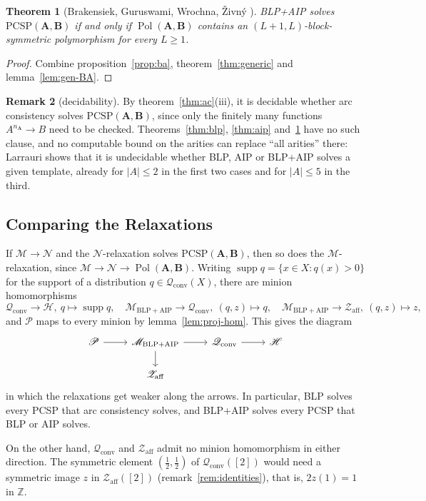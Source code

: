 \documentclass[11pt]{article}
\theoremstyle{plain}
\newtheorem{theorem}{Theorem}[section]
\theoremstyle{definition}
\newtheorem{remark}[theorem]{Remark}
\newcommand{\Pol}{\operatorname{Pol}}
\newcommand{\supp}{\operatorname{supp}}
\newcommand{\bA}{\mathbf{A}}
\newcommand{\bB}{\mathbf{B}}
\newcommand{\Pm}{\mathscr{P}}
\newcommand{\M}{\mathscr{M}}
\newcommand{\N}{\mathscr{N}}
\newcommand{\Hm}{\mathscr{H}}
\newcommand{\Z}{\mathbb{Z}}
\newcommand{\Qc}{\mathscr{Q}_{\mathrm{conv}}}
\newcommand{\Za}{\mathscr{Z}_{\mathrm{aff}}}
\newcommand{\Mba}{\mathscr{M}_{\mathrm{BLP+AIP}}}
\newcommand{\PCSP}{\mathrm{PCSP}}
\begin{document}
\begin{theorem}[Brakensiek, Guruswami, Wrochna, Živný \cite{BGWZ}]\label{thm:blp-aip}
BLP+AIP solves $\PCSP(\bA,\bB)$ if and only if $\Pol(\bA,\bB)$ contains an $(L+1,L)$-block-symmetric polymorphism for every $L\geq1$.
\end{theorem}

\begin{proof}
Combine proposition~\ref{prop:ba}, theorem~\ref{thm:generic} and lemma~\ref{lem:gen-BA}.
\end{proof}

\begin{remark}[decidability]
By theorem~\ref{thm:ac}(iii), it is decidable whether arc consistency solves $\PCSP(\bA,\bB)$, since only the finitely many functions $A^{n_{\bA}}\to B$ need to be checked. Theorems~\ref{thm:blp}, \ref{thm:aip} and~\ref{thm:blp-aip} have no such clause, and no computable bound on the arities can replace ``all arities'' there: Larrauri \cite{Lar} shows that it is undecidable whether BLP, AIP or BLP+AIP solves a given template, already for $|A|\leq2$ in the first two cases and for $|A|\leq5$ in the third.
\end{remark}

\subsection{Comparing the Relaxations}\label{sec:compare}

If $\M\to\N$ and the $\N$-relaxation solves $\PCSP(\bA,\bB)$, then so does the $\M$-relaxation, since $\M\to\N\to\Pol(\bA,\bB)$. Writing $\supp q=\{x\in X : q(x)>0\}$ for the support of a distribution $q\in\Qc(X)$, there are minion homomorphisms
\[
\Qc\to\Hm,\ q\mapsto\supp q,\quad\Mba\to\Qc,\ (q,z)\mapsto q,\quad\Mba\to\Za,\ (q,z)\mapsto z,
\]
and $\Pm$ maps to every minion by lemma~\ref{lem:proj-hom}. This gives the diagram
\[
\begin{tikzcd}[row sep=1.6em]
\Pm\arrow[r] & \Mba\arrow[r]\arrow[d] & \Qc\arrow[r] & \Hm\\
 & \Za & &
\end{tikzcd}
\]
in which the relaxations get weaker along the arrows. In particular, BLP solves every PCSP that arc consistency solves, and BLP+AIP solves every PCSP that BLP or AIP solves.

On the other hand, $\Qc$ and $\Za$ admit no minion homomorphism in either direction. The symmetric element $(\frac12,\frac12)$ of $\Qc([2])$ would need a symmetric image $z$ in $\Za([2])$ (remark~\ref{rem:identities}), that is, $2z(1)=1$ in $\Z$.
\end{document}
